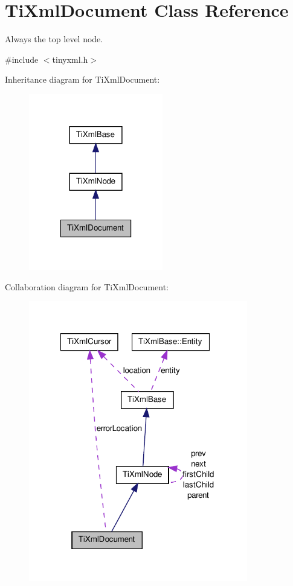 \hypertarget{classTiXmlDocument}{
\section{TiXmlDocument Class Reference}
\label{df/d09/classTiXmlDocument}
}


Always the top level node.  




{\ttfamily \#include $<$tinyxml.h$>$}



Inheritance diagram for TiXmlDocument:
\nopagebreak
\begin{figure}[H]
\begin{center}
\leavevmode
\includegraphics[width=166pt]{d0/d17/classTiXmlDocument__inherit__graph}
\end{center}
\end{figure}


Collaboration diagram for TiXmlDocument:
\nopagebreak
\begin{figure}[H]
\begin{center}
\leavevmode
\includegraphics[width=271pt]{d6/d1e/classTiXmlDocument__coll__graph}
\end{center}
\end{figure}
